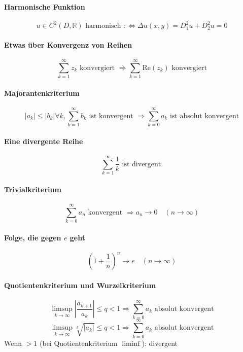 \documentclass[a4paper, 10pt, DIV20, headings=small]{scrartcl}
\theoremstyle{definition}
\theoremstyle{plain}
\begin{document}
\paragraph{Harmonische Funktion}
$$u \in C^2(D,\mathbb{R}) \text{ harmonisch } :\Leftrightarrow \Delta u(x,y) = D_1^2 u + D_2^2 u = 0$$

\paragraph{Etwas über Konvergenz von Reihen}
$$\sum\limits_{k=1}^\infty{z_k} \text{ konvergiert } \Rightarrow \sum\limits_{k=1}^\infty{\text{Re}(z_k)} \text{ konvergiert}$$

\paragraph{Majorantenkriterium}
$$|a_k| \leq |b_k| \forall k, \sum\limits_{k=1}^{\infty}{b_k} \text{ ist konvergent } \Rightarrow \sum\limits_{k=0}^\infty {a_k} \text{ ist absolut konvergent}$$

\paragraph{Eine divergente Reihe}
$$\sum\limits_{k=1}^\infty{\frac{1}{k}} \text{ ist divergent.}$$


\paragraph{Trivialkriterium}
$$\sum\limits_{k=0}^{\infty}a_n \text{ konvergent } \Rightarrow a_n \rightarrow 0 \quad (n \rightarrow \infty)$$

\paragraph{Folge, die gegen $e$ geht}
$$\left(1+\frac{1}{n}\right)^n \rightarrow e \quad (n \rightarrow \infty)$$

\paragraph{Quotientenkriterium und Wurzelkriterium}
$$\limsup\limits_{k \rightarrow \infty} \left|\frac{a_{k+1}}{a_k}\right| \leq q < 1 \Rightarrow \sum\limits_{k=0}^\infty a_k \text{ absolut konvergent}$$
$$\limsup\limits_{k \rightarrow \infty} \sqrt[k]{|a_k|} \leq q < 1 \Rightarrow \sum\limits_{k=0}^\infty a_k \text{ absolut konvergent}$$
Wenn $> 1$ (bei Quotientenkriterium $\liminf$): divergent
\end{document}
